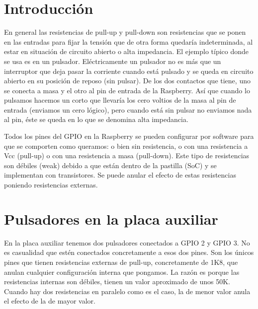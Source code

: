 \pagestyle{fancy}
\fancyhead[LE,RO]{\thepage}
\fancyhead[LO]{\nouppercase{\rightmark}}

\label{chp:resistencias}
\minitoc

\section{Introducción}

En general las resistencias de pull-up y pull-down son resistencias que se ponen en
las entradas para fijar la tensión que de otra forma quedaría indeterminada, al estar
en situación de circuito abierto o alta impedancia. El ejemplo típico donde se usa es
en un pulsador. Eléctricamente un pulsador no es más que un interruptor que deja pasar
la corriente cuando está pulsado y se queda en circuito abierto en su posición de reposo
(sin pulsar). De los dos contactos que tiene, uno se conecta a masa y el otro al pin de
entrada de la Raspberry. Así que cuando lo pulsamos hacemos un corto que llevaría los cero
voltios de la masa al pin de entrada (enviamos un cero lógico), pero cuando está sin pulsar
no enviamos nada al pin, éste se queda en lo que se denomina alta impedancia.

Todos los pines del GPIO en la Raspberry se pueden configurar por software para que
se comporten como queramos: o bien sin resistencia, o con una resistencia a Vcc (pull-up) o
con una resistencia a masa (pull-down). Este tipo de resistencias son débiles (weak) debido
a que están dentro de la pastilla (SoC) y se implementan con transistores. Se puede
anular el efecto de estas resistencias poniendo resistencias externas.

\section{Pulsadores en la placa auxiliar}

En la placa auxiliar tenemos dos pulsadores conectados a GPIO 2 y GPIO 3. No es casualidad
que estén conectados concretamente a esos dos pines. Son los únicos pines que tienen
resistencias externas de pull-up, concretamente de 1K8, que anulan cualquier configuración
interna que pongamos. La razón es porque las resistencias internas son débiles, tienen un
valor aproximado de unos 50K. Cuando hay dos resistencias en paralelo como es el caso,
la de menor valor anula el efecto de la de mayor valor.

